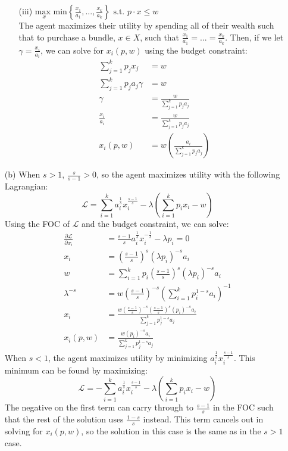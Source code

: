 \documentclass{article}
\newcommand{\usmax}[1]{\underset{#1}{\text{max }}}
\renewcommand{\L}{\mathcal{L}}
\begin{document}
\begin{itemize}
\begin{itemize}
			\item[(iii)] $\usmax{x}\text{min}\left\{\frac{x_1}{a_1},...,\frac{x_k}{a_k}\right\}\text{ s.t. }p\cdot x\leq w$
				\medskip \\
				The agent maximizes their utility by spending all of their wealth such that to purchase a bundle, $x\in X$, such that ${\frac{x_1}{a_1}=...=\frac{x_k}{a_k}}$. Then, if we let $\gamma=\frac{x_i}{a_i}$, we can solve for $x_i(p,w)$ using the budget constraint:
				\begin{align*}
					\sum_{j=1}^kp_jx_j 			&= w 							\\
					\sum_{j=1}^kp_ja_j\gamma  	&= w 							\\
										\gamma 	&= \frac{w}{\sum_{j=1}^kp_ja_j}	\\
								\frac{x_i}{a_i}	&= \frac{w}{\sum_{j=1}^kp_ja_j}	\\
									x_i(p,w)	&= w\left(\frac{a_i}{\sum_{j=1}^kp_ja_j}\right)
				\end{align*}
			
		\end{itemize}
			
	\item[(b)] When $s>1$, $\frac{s}{s-1}>0$, so the agent maximizes utility with the following Lagrangian:
		\[
			\L = \sum_{i=1}^k a_i^\frac{1}{s}x_i^\frac{s-1}{s}-\lambda\left(\sum_{i=1}^kp_ix_i-w\right)
		\]
		Using the FOC of $\L$ and the budget constraint, we can solve:
		\begin{align*}
			\frac{\partial\L}{\partial x_i} &= \frac{s-1}{s}a_i^\frac{1}{s}x_i^{-\frac{1}{s}} - \lambda p_i = 0				\\
										x_i	&= \left(\frac{s-1}{s}\right)^s(\lambda p_i)^{-s}a_i							\\
										w 	&= \sum_{i=1}^k p_i\left(\frac{s-1}{s}\right)^s(\lambda p_i)^{-s}a_i			\\
							\lambda^{-s}	&= w\left(\frac{s-1}{s}\right)^{-s}\left(\sum_{i=1}^k p_i^{1-s}a_i\right)^{-1}	\\
										x_i	&= \frac{w\left(\frac{s-1}{s}\right)^{-s}
												\left(\frac{s-1}{s}\right)^s(p_i)^{-s}a_i}{\sum_{j=1}^k p_j^{1-s}a_j} 		\\
								x_i(p,w)	&= \frac{w(p_i)^{-s}a_i}{\sum_{j=1}^k p_j^{1-s}a_j}
		\end{align*}
		When $s<1$, the agent maximizes utility by minimizing $a_i^\frac{1}{s}x_i^\frac{s-1}{s}$. This minimum can be found by maximizing:
		\[
			\L = -\sum_{i=1}^k a_i^\frac{1}{s}x_i^\frac{s-1}{s}-\lambda\left(\sum_{i=1}^kp_ix_i-w\right)
		\]
		The negative on the first term can carry through to $\frac{s-1}{s}$ in the FOC such that the rest of the solution uses $\frac{1-s}{s}$ instead. This term cancels out in solving for $x_i(p,w)$, so the solution in this case is the same as in the $s>1$ case.
		

\end{itemize}
\end{document}
